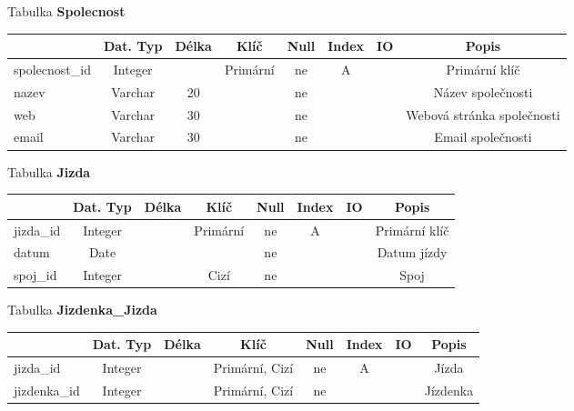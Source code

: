\documentclass[11pt]{article}
\begin{document}
\noindent
Tabulka \textbf{Spolecnost}

\begin{table}[H]
    \begin{tabular}{|l|c|c|c|c|c|c|c|} \hline
                        & Dat. Typ  & Délka & Klíč      & Null  & Index & IO    & Popis \\ \hline
        spolecnost\_id	& Integer	&	    & Primární	& ne	& A		&       & Primární klíč \\ \hline
        nazev	        & Varchar	& 20	&	        & ne	&		&       & Název společnosti \\ \hline
        web             & Varchar   & 30    &           & ne    &       &       & Webová stránka společnosti \\ \hline
        email           & Varchar   & 30    &           & ne    &       &       & Email společnosti \\ \hline
    \end{tabular}
\end{table}

\noindent
Tabulka \textbf{Jizda}

\begin{table}[H]
    \begin{tabular}{|l|c|c|c|c|c|c|c|} \hline
                    & Dat. Typ  & Délka & Klíč      & Null  & Index & IO    & Popis \\ \hline
        jizda\_id	& Integer	&	    & Primární	& ne	& A		&       & Primární klíč \\ \hline
        datum	    & Date		&	    &           & ne	&		&       & Datum jízdy \\ \hline
        spoj\_id	& Integer	&	    & Cizí	    & ne	&   	&	    & Spoj \\ \hline
    \end{tabular}
\end{table}

\noindent
Tabulka \textbf{Jizdenka\_Jizda}

\begin{table}[H]
    \begin{tabular}{|l|c|c|c|c|c|c|c|} \hline
                    & Dat. Typ  & Délka & Klíč              & Null  & Index & IO    & Popis \\ \hline
    jizda\_id       & Integer   &       & Primární, Cizí	& ne	& A     &       & Jízda \\ \hline
    jizdenka\_id    & Integer   &       & Primární, Cizí    & ne    &       &       & Jízdenka \\ \hline
    \end{tabular}
\end{table}
\end{document}
